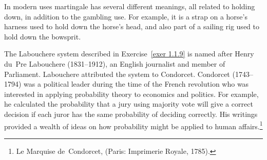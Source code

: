 In modern uses martingale has several different meanings, all related to \emx
{holding down,} in addition to the gambling use.  For example, it is a strap
on a horse's harness used to hold down the horse's head, and also part of a
sailing rig used to hold down the bowsprit.

The Labouchere system described in Exercise~\ref{exer 1.1.9} 
is named after Henry du~Pre Labouchere 
(1831--1912), an English journalist and member of Parliament.  La\-bou\-chere attributed the 
system to Condorcet.  Condorcet (1743--1794) was a political 
leader during the time of the French revolution who was interested in applying probability 
theory to economics and politics.  For example, he calculated the probability that a jury using
majority vote will give a correct decision if each juror has the same probability of
deciding correctly.  His writings provided a wealth of ideas on how
probability might be applied to human affairs.\footnote{ Le Marquise de~Condorcet, 
 (Paris: Imprimerie Royale, 1785).}

